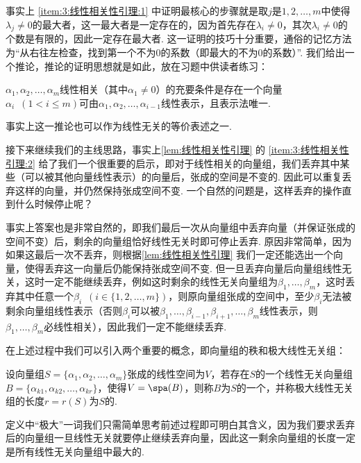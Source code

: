 事实上 \ref*{item:3:线性相关性引理:1} 中证明最核心的步骤就是取$j$是$1,2,\ldots,m$中使得$\lambda_j\neq 0$的最大者，这一最大者是一定存在的，因为首先存在$\lambda_i\neq 0$，其次$\lambda_i\neq 0$的个数是有限的，因此一定存在最大者. 这一证明的技巧十分重要，通俗的记忆方法为``从右往左检查，找到第一个不为0的系数（即最大的不为0的系数）''. 我们给出一个推论，推论的证明思想就是如此，放在习题中供读者练习：
\begin{corollary}{}{}
    $\alpha_1,\alpha_2,\ldots,\alpha_m$线性相关（其中$\alpha_1\neq 0$）的充要条件是存在一个向量$\alpha_i\enspace(1 < i \leqslant m)$可由$\alpha_1,\alpha_2,\ldots,\alpha_{i-1}$线性表示，且表示法唯一.
\end{corollary}
事实上这一推论也可以作为线性无关的等价表述之一.

接下来继续我们的主线思路，事实上\autoref{lem:线性相关性引理} 的 \ref*{item:3:线性相关性引理:2} 给了我们一个很重要的启示，即对于线性相关的向量组，我们丢弃其中某些（可以被其他向量线性表示）的向量后，张成的空间是不变的. 因此可以重复丢弃这样的向量，并仍然保持张成空间不变. 一个自然的问题是，这样丢弃的操作直到什么时候停止呢？

事实上答案也是非常自然的，即我们最后一次从向量组中丢弃向量（并保证张成的空间不变）后，剩余的向量组恰好线性无关时即可停止丢弃. 原因非常简单，因为如果这最后一次不丢弃，则根据\autoref{lem:线性相关性引理} 我们一定还能选出一个向量，使得丢弃这一向量后仍能保持张成空间不变. 但一旦丢弃向量后向量组线性无关，这时一定不能继续丢弃，例如这时剩余的线性无关向量组为$\beta_1,\ldots,\beta_m$，这时丢弃其中任意一个$\beta_i\enspace (i\in\{1,2,\ldots,m\})$，则原向量组张成的空间中，至少$\beta_i$无法被剩余向量组线性表示（否则$\beta_i$可以被$\beta_1,\ldots,\beta_{i-1},\beta_{i+1},\ldots,\beta_m$线性表示，则$\beta_1,\ldots,\beta_m$必线性相关），因此我们一定不能继续丢弃.

在上述过程中我们可以引入两个重要的概念，即向量组的秩和极大线性无关组：
\begin{definition}{}{}
    设向量组$S=\{\alpha_1,\alpha_2,\ldots,\alpha_m\}$张成的线性空间为$V$，若存在$S$的一个线性无关向量组$B=\{\alpha_{k1},\alpha_{k2},\ldots,\alpha_{kr}\}$，使得$V=\spa(B)$，则称$B$为$S$的一个，并称极大线性无关组的长度$r=r(S)$为$S$的.
\end{definition}
定义中``极大''一词我们只需简单思考前述过程即可明白其含义，因为我们要求丢弃后的向量组一旦线性无关就要停止继续丢弃向量，因此这一剩余向量组的长度一定是所有线性无关向量组中最大的.

